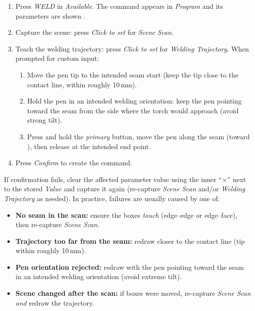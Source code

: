 \begin{enumerate}
  \item Press \emph{WELD}  in \emph{Available}.
        The command appears in \emph{Program}  and its parameters are shown .
  \item Capture the scene: press \emph{Click to set}  for \emph{Scene Scan}.
  \item Teach the welding trajectory: press \emph{Click to set}  for \emph{Welding Trajectory}.
        When prompted for custom input:
        \begin{enumerate}[label=(\roman*)]
          \item Move the pen tip to the intended seam start  (keep the tip close to the contact line, within roughly 10\,mm).
          \item Hold the pen in an intended welding orientation: keep the pen pointing toward the seam from the side where the torch would approach (avoid strong tilt).
          \item Press and hold the \emph{primary} button, move the pen along the seam (toward ), then release at the intended end point.
        \end{enumerate}
  \item Press \emph{Confirm}  to create the command.
\end{enumerate}

If confirmation fails, clear the affected parameter value using the inner ``$\times$'' next to the stored \emph{Value} and capture it again (re-capture \emph{Scene Scan} and/or \emph{Welding Trajectory} as needed).
In practice, failures are usually caused by one of:
\begin{itemize}
  \item \textbf{No seam in the scan:} ensure the boxes \emph{touch} (edge--edge or edge--face), then re-capture \emph{Scene Scan}.
  \item \textbf{Trajectory too far from the seam:} redraw closer to the contact line (tip within roughly 10\,mm).
  \item \textbf{Pen orientation rejected:} redraw with the pen pointing toward the seam in an intended welding orientation (avoid extreme tilt).
  \item \textbf{Scene changed after the scan:} if boxes were moved, re-capture \emph{Scene Scan} \emph{and} redraw the trajectory.
\end{itemize}

